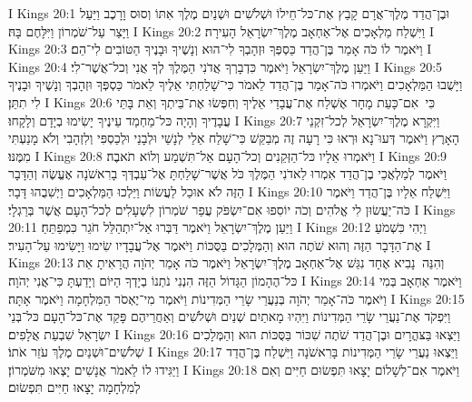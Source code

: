 I Kings 20:1	וּבֶן־הֲדַד מֶלֶךְ־אֲרָם קָבַץ אֶת־כּל־חֵילוֹ וּשְׁלֹשִׁים וּשְׁנַיִם מֶלֶךְ אִתּוֹ וְסוּס וָרָכֶב וַיַּעַל וַיָּצַר עַל־שֹׁמְרוֹן וַיִּלָּחֶם בָּהּ׃
I Kings 20:2	וַיִּשְׁלַח מַלְאָכִים אֶל־אַחְאָב מֶלֶךְ־יִשְׂרָאֵל הָעִירָה׃
I Kings 20:3	וַיֹּאמֶר לוֹ כֹּה אָמַר בֶּן־הֲדַד כַּסְפְּךָ וּזְהָבְךָ לִי־הוּא וְנָשֶׁיךָ וּבָנֶיךָ הַטּוֹבִים לִי־הֵם׃
I Kings 20:4	וַיַּעַן מֶלֶךְ־יִשְׂרָאֵל וַיֹּאמֶר כִּדְבָרְךָ אֲדֹנִי הַמֶּלֶךְ לְךָ אֲנִי וְכל־אֲשֶׁר־לִי׃
I Kings 20:5	וַיָּשֻׁבוּ הַמַּלְאָכִים וַיֹּאמְרוּ כֹּה־אָמַר בֶּן־הֲדַד לֵאמֹר כִּי־שָׁלַחְתִּי אֵלֶיךָ לֵאמֹר כַּסְפְּךָ וּזְהָבְךָ וְנָשֶׁיךָ וּבָנֶיךָ לִי תִתֵּן׃
I Kings 20:6	כִּי  אִם־כָּעֵת מָחָר אֶשְׁלַח אֶת־עֲבָדַי אֵלֶיךָ וְחִפְּשׂוּ אֶת־בֵּיתְךָ וְאֵת בָּתֵּי עֲבָדֶיךָ וְהָיָה כּל־מַחְמַד עֵינֶיךָ יָשִׂימוּ בְיָדָם וְלָקָחוּ׃
I Kings 20:7	וַיִּקְרָא מֶלֶךְ־יִשְׂרָאֵל לְכל־זִקְנֵי הָאָרֶץ וַיֹּאמֶר דְּעוּ־נָא וּרְאוּ כִּי רָעָה זֶה מְבַקֵּשׁ כִּי־שָׁלַח אֵלַי לְנָשַׁי וּלְבָנַי וּלְכַסְפִּי וְלִזְהָבִי וְלֹא מָנַעְתִּי מִמֶּנּוּ׃
I Kings 20:8	וַיֹּאמְרוּ אֵלָיו כּל־הַזְּקֵנִים וְכל־הָעָם אַל־תִּשְׁמַע וְלוֹא תֹאבֶה׃
I Kings 20:9	וַיֹּאמֶר לְמַלְאֲכֵי בֶן־הֲדַד אִמְרוּ לַאדֹנִי הַמֶּלֶךְ כֹּל אֲשֶׁר־שָׁלַחְתָּ אֶל־עַבְדְּךָ בָרִאשֹׁנָה אֶעֱשֶׂה וְהַדָּבָר הַזֶּה לֹא אוּכַל לַעֲשׂוֹת וַיֵּלְכוּ הַמַּלְאָכִים וַיְשִׁבֻהוּ דָּבָר׃
I Kings 20:10	וַיִּשְׁלַח אֵלָיו בֶּן־הֲדַד וַיֹּאמֶר כֹּה־יַעֲשׂוּן לִי אֱלֹהִים וְכֹה יוֹסִפוּ אִם־יִשְׂפֹּק עֲפַר שֹׁמְרוֹן לִשְׁעָלִים לְכל־הָעָם אֲשֶׁר בְּרַגְלָי׃
I Kings 20:11	וַיַּעַן מֶלֶךְ־יִשְׂרָאֵל וַיֹּאמֶר דַּבְּרוּ אַל־יִתְהַלֵּל חֹגֵר כִּמְפַתֵּחַ׃
I Kings 20:12	וַיְהִי כִּשְׁמֹעַ אֶת־הַדָּבָר הַזֶּה וְהוּא שֹׁתֶה הוּא וְהַמְּלָכִים בַּסֻּכּוֹת וַיֹּאמֶר אֶל־עֲבָדָיו שִׂימוּ וַיָּשִׂימוּ עַל־הָעִיר׃
I Kings 20:13	וְהִנֵּה  נָבִיא אֶחָד נִגַּשׁ אֶל־אַחְאָב מֶלֶךְ־יִשְׂרָאֵל וַיֹּאמֶר כֹּה אָמַר יְהֹוָה הֲרָאִיתָ אֵת כּל־הֶהָמוֹן הַגָּדוֹל הַזֶּה הִנְנִי נֹתְנוֹ בְיָדְךָ הַיּוֹם וְיָדַעְתָּ כִּי־אֲנִי יְהֹוָה׃
I Kings 20:14	וַיֹּאמֶר אַחְאָב בְּמִי וַיֹּאמֶר כֹּה־אָמַר יְהֹוָה בְּנַעֲרֵי שָׂרֵי הַמְּדִינוֹת וַיֹּאמֶר מִי־יֶאְסֹר הַמִּלְחָמָה וַיֹּאמֶר אָתָּה׃
I Kings 20:15	וַיִּפְקֹד אֶת־נַעֲרֵי שָׂרֵי הַמְּדִינוֹת וַיִּהְיוּ מָאתַיִם שְׁנַיִם וּשְׁלֹשִׁים וְאַחֲרֵיהֶם פָּקַד אֶת־כּל־הָעָם כּל־בְּנֵי יִשְׂרָאֵל שִׁבְעַת אֲלָפִים׃
I Kings 20:16	וַיֵּצְאוּ בַּצּהֳרָיִם וּבֶן־הֲדַד שֹׁתֶה שִׁכּוֹר בַּסֻּכּוֹת הוּא וְהַמְּלָכִים שְׁלֹשִׁים־וּשְׁנַיִם מֶלֶךְ עֹזֵר אֹתוֹ׃
I Kings 20:17	וַיֵּצְאוּ נַעֲרֵי שָׂרֵי הַמְּדִינוֹת בָּרִאשֹׁנָה וַיִּשְׁלַח בֶּן־הֲדַד וַיַּגִּידוּ לוֹ לֵאמֹר אֲנָשִׁים יָצְאוּ מִשֹּׁמְרוֹן׃
I Kings 20:18	וַיֹּאמֶר אִם־לְשָׁלוֹם יָצָאוּ תִּפְשׂוּם חַיִּים וְאִם לְמִלְחָמָה יָצָאוּ חַיִּים תִּפְשׂוּם׃
